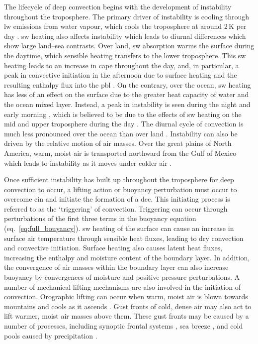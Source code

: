 The lifecycle of deep convection begins with the development of instability throughout the troposphere. 
The primary driver of instability is cooling through \acrshort{lw} emissions from water vapour, which cools the troposphere at around 2\,\unit{K} per day \citep{jeevanjee_simple_2020}. 
\acrshort{sw} heating also affects instability which leads to diurnal differences which show large land--sea contrasts. 
Over land, \acrshort{sw} absorption warms the surface during the daytime, which sensible heating transfers to the lower troposphere. 
This \acrshort{sw} heating leads to an increase in \acrshort{cape} throughout the day, and, in particular, a peak in convective initiation in the afternoon due to surface heating and the resulting enthalpy flux into the \acrshort{pbl} \citep{hendon_diurnal_1993}.
On the contrary, over the ocean, \acrshort{sw} heating has less of an effect on the surface due to the greater heat capacity of water and the ocean mixed layer. 
Instead, a peak in instability is seen during the night and early morning \citep{gray_diurnal_1977}, which is believed to be due to the effects of \acrshort{sw} heating on the mid and upper troposphere during the day \citep{wall_life_2018}. 
The diurnal cycle of convection is much less pronounced over the ocean than over land \citep{soden_diurnal_2000}.
Instability can also be driven by the relative motion of air masses. 
Over the great plains of North America, warm, moist air is transported northward from the Gulf of Mexico which leads to instability as it moves under colder air \citep{walters_airflow_2001}.

Once sufficient instability has built up throughout the troposphere for deep convection to occur, a lifting action or buoyancy perturbation must occur to overcome \acrshort{cin} and initiate the formation of a \acrshort{dcc}.
This initiating process is referred to as the `triggering' of convection.
Triggering can occur through perturbations of the first three terms in the buoyancy equation (eq.~\ref{eq:full_bouyancy}).
\acrshort{sw} heating of the surface can cause an increase in surface air temperature through sensible heat fluxes, leading to dry convection and convective initiation.
Surface heating also causes latent heat fluxes, increasing the enthalpy and moisture content of the boundary layer.
In addition, the convergence of air masses within the boundary layer can also increase buoyancy by convergences of moisture and positive pressure perturbations.
A number of mechanical lifting mechanisms are also involved in the initiation of convection.
Orographic lifting can occur when warm, moist air is blown towards mountains and cools as it ascends \citep{hodges_distribution_1997}. 
Gust fronts of cold, dense air may also act to lift warmer, moist air masses above them. 
These gust fronts may be caused by a number of processes, including synoptic frontal systems \citep{wilson_initiation_1986, jirak_observational_2007}, sea breeze \citep{tripoli_numerical_1979, park_environmental_2020}, and cold pools caused by precipitation \citep{grant_cold_2016}.

